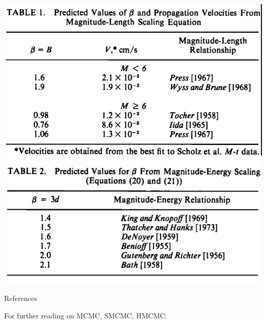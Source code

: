 \documentclass[aspectratio=43,9pt]{beamer}
\newcommand\dirbiblio{/home/hugo/svn/SEISCOPE_ARTICLES/BIBLIO/}
\begin{document}
\begin{frame}{}

\begin{minipage}{0.45\linewidth}
  \includegraphics[width=1\linewidth]{Figs/tables.jpg}
\end{minipage}
\begin{minipage}{0.45\linewidth}
\end{minipage}

\end{frame}


\begin{frame}[allowframebreaks]{References}

{\Large For further reading on MCMC, SMCMC, HMCMC:}

%    
    
\end{frame}
\end{document}
